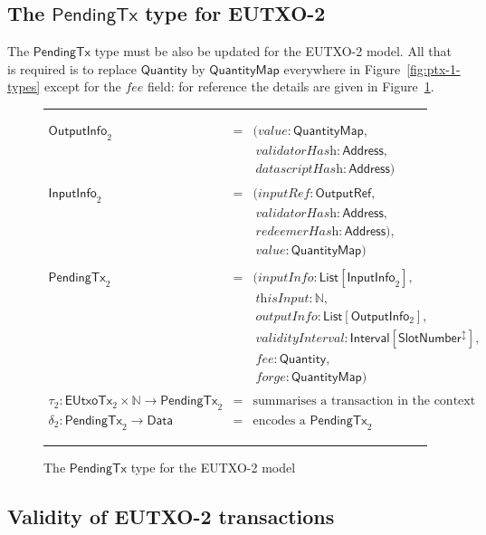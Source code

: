 \documentclass[a4paper]{article}
\renewcommand{\i}{\textit}  %
\newcommand{\s}{\textsf}  %
\newcommand{\msf}[1]{\ensuremath{\mathsf{#1}}}
\newcommand{\mi}[1]{\ensuremath{\mathit{#1}}}
\newcommand\rfskip{7pt}
\newenvironment{ruledfigure}[1]{\begin{figure}[#1]\hrule\vspace{\rfskip}}{\vspace{\rfskip}\hrule\end{figure}}
\newcommand{\List}[1]{\ensuremath{\s{List}[#1]}}
\newcommand{\Interval}[1]{\ensuremath{\s{Interval}[#1]}}
\newcommand{\extended}[1]{#1^\updownarrow}
\newcommand{\ptx}{\ensuremath{\s{PendingTx}}}
\newcommand{\forge}{\mi{forge}}
\newcommand{\fee}{\mi{fee}}
\newcommand{\Data}{\ensuremath{\s{Data}}}
\newcommand{\slotnum}{\ensuremath{\s{SlotNumber}}}
\newcommand{\eutxotx}{\msf{EUtxoTx}}
\newcommand{\qty}{\ensuremath{\s{Quantity}}}
\newcommand{\qtymap}{\ensuremath{\s{QuantityMap}}}
\newcommand\N{\ensuremath{\mathbb{N}}}
\begin{document}
\subsection{The \ptx{} type for EUTXO-2}
\label{sec:pendingtx-2}
The \ptx{} type must be also be updated for the EUTXO-2 model.  All
that is required is to replace \qty{} by \qtymap{} everywhere in
Figure~\ref{fig:ptx-1-types} except for the \fee{} field: for reference
the details are given in Figure~\ref{fig:ptx-2-types}.
\begin{ruledfigure}{H}
  \begin{displaymath}
  \begin{array}{rll}
    \s{OutputInfo}_2\s{ } &=&(\i{value}: \qtymap,\\
                          & &\ \i{validatorHash}: \s{Address},\\
                          & &\ \i{datascriptHash}: \s{Address})\\
    \\
    \s{InputInfo}_2\s{ } &=& (\i{inputRef}: \s{OutputRef},\\
                         & &\ \i{validatorHash}: \s{Address},\\
                         & &\ \i{redeemerHash}: \s{Address}),\\
                         & &\ \i{value}: \qtymap)\\
     \\
     \ptx_2\s{ } &=&(\i{inputInfo}: \List{\s{InputInfo}_2},\\
                 & &\ \i{thisInput}: \N,\\
                 & &\ \i{outputInfo}: \List{\s{OutputInfo$_2$}},\\
                 & &\ \i{validityInterval}: \Interval{\extended{\slotnum}},\\
                 & &\ \fee: \qty,\\
                 & &\ \forge: \qtymap)\\
    \\
    \tau_2: \eutxotx_2 \times \N \rightarrow \ptx_2 &=& \mbox{summarises a transaction in the context of an input}\\
    \delta_2: \ptx_2 \rightarrow \Data &=& \mbox{encodes a $\ptx_2$}
  \end{array}
  \end{displaymath}
  \caption{The \ptx{} type for the EUTXO-2 model}
  \label{fig:ptx-2-types}
\end{ruledfigure}

\subsection{Validity of EUTXO-2 transactions}
\label{sec:eutxo-2-validity}
\end{document}
